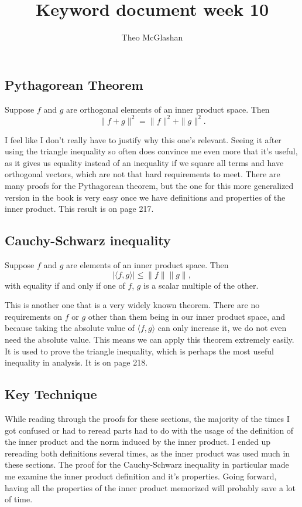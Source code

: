 \documentclass[12pt]{amsart}
\title{Keyword document week 10}
\author{Theo McGlashan}
\date{}
\newcommand{\eq}[1]{\begin{equation*}#1\end{equation*}}
\begin{document}
\maketitle

\subsection*{Pythagorean Theorem}

Suppose $f$ and $g$ are orthogonal elements of an inner product space. Then
\eq{\|f+g\|^2 = \|f\|^2 + \|g\|^2.}

I feel like I don't really have to justify why this one's relevant. Seeing it after using the triangle inequality so often does convince me even more that it's useful, as it gives us equality instead of an inequality if we square all terms and have orthogonal vectors, which are not that hard requirements to meet. There are many proofs for the Pythagorean theorem, but the one for this more generalized version in the book is very easy once we have definitions and properties of the inner product. This result is on page 217.

\subsection*{Cauchy-Schwarz inequality}

Suppose $f$ and $g$ are elements of an inner product space. Then
\eq{|\langle f, g \rangle| \leq \|f\|\|g\|,}
with equality if and only if one of $f$, $g$ is a scalar multiple of the other.

This is another one that is a very widely known theorem. There are no requirements on $f$ or $g$ other than them being in our inner product space, and because taking the absolute value of $\langle f, g \rangle$ can only increase it, we do not even need the absolute value. This means we can apply this theorem extremely easily. It is used to prove the triangle inequality, which is perhaps the most useful inequality in analysis. It is on page 218.

\subsection*{Key Technique}

While reading through the proofs for these sections, the majority of the times I got confused or had to reread parts had to do with the usage of the definition of the inner product and the norm induced by the inner product. I ended up rereading both definitions several times, as the inner product was used much in these sections. The proof for the Cauchy-Schwarz inequality in particular made me examine the inner product definition and it's properties. Going forward, having all the properties of the inner product memorized will probably save a lot of time.
\end{document}
